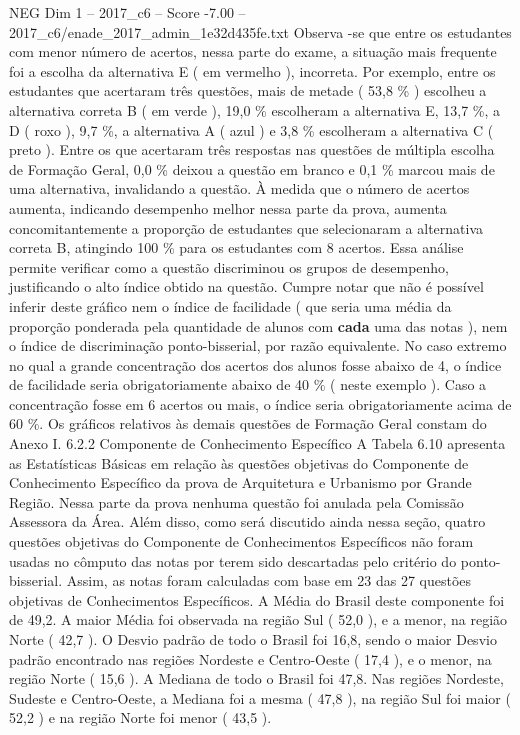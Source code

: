 \begin{textsample}{NEG Dim 1 – 2017\_c6 – Score -7.00 – 2017\_c6/enade\_2017\_admin\_1e32d435fe.txt}
Observa -se que entre os estudantes com menor número de acertos, nessa parte do exame, a situação mais frequente foi a escolha da alternativa E ( em vermelho ), incorreta.
Por exemplo, entre os estudantes que acertaram três questões, mais de metade ( 53,8 \% ) escolheu a alternativa correta B ( em verde ), 19,0 \% escolheram a alternativa E, 13,7 \%, a D ( roxo ), 9,7 \%, a alternativa A ( azul ) e 3,8 \% escolheram a alternativa C ( preto ).
Entre os que acertaram três respostas nas questões de múltipla escolha de Formação Geral, 0,0 \% deixou a questão em branco e 0,1 \% marcou mais de uma alternativa, invalidando a questão.
À medida que o número de acertos aumenta, indicando desempenho melhor nessa parte da prova, aumenta concomitantemente a proporção de estudantes que selecionaram a alternativa correta B, atingindo 100 \% para os estudantes com 8 acertos.
Essa análise permite verificar como a questão discriminou os grupos de desempenho, justificando o alto índice obtido na questão.
Cumpre notar que não é possível inferir deste gráfico nem o índice de facilidade ( que seria uma média da proporção ponderada pela quantidade de alunos com \textbf{cada} uma das notas ), nem o índice de discriminação ponto-bisserial, por razão equivalente.
No caso extremo no qual a grande concentração dos acertos dos alunos fosse abaixo de 4, o índice de facilidade seria obrigatoriamente abaixo de 40 \% ( neste exemplo ).
Caso a concentração fosse em 6 acertos ou mais, o índice seria obrigatoriamente acima de 60 \%.
Os gráficos relativos às demais questões de Formação Geral constam do Anexo I. 6.2.2 Componente de Conhecimento Específico A Tabela 6.10 apresenta as Estatísticas Básicas em relação às questões objetivas do Componente de Conhecimento Específico da prova de Arquitetura e Urbanismo por Grande Região.
Nessa parte da prova nenhuma questão foi anulada pela Comissão Assessora da Área.
Além disso, como será discutido ainda nessa seção, quatro questões objetivas do Componente de Conhecimentos Específicos não foram usadas no cômputo das notas por terem sido descartadas pelo critério do ponto-bisserial.
Assim, as notas foram calculadas com base em 23 das 27 questões objetivas de Conhecimentos Específicos.
A Média do Brasil deste componente foi de 49,2.
A maior Média foi observada na região Sul ( 52,0 ), e a menor, na região Norte ( 42,7 ).
O Desvio padrão de todo o Brasil foi 16,8, sendo o maior Desvio padrão encontrado nas regiões Nordeste e Centro-Oeste ( 17,4 ), e o menor, na região Norte ( 15,6 ).
A Mediana de todo o Brasil foi 47,8.
Nas regiões Nordeste, Sudeste e Centro-Oeste, a Mediana foi a mesma ( 47,8 ), na região Sul foi maior ( 52,2 ) e na região Norte foi menor ( 43,5 ).

\end{textsample}
